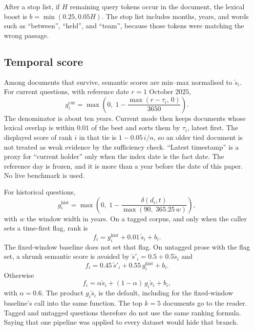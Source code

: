 \documentclass[11pt,letterpaper]{article}
\begin{document}
After a stop list, if $H$ remaining query tokens occur in the document, the lexical boost is $b=\min(0.25, 0.05H)$.
The stop list includes months, years, and words such as ``between'', ``held'', and ``team'', because those tokens were matching the wrong passage.

\subsection{Temporal score}

Among documents that survive, semantic scores are min--max normalised to $\tilde{s}_i$.
For current questions, with reference date $r=\text{1 October 2025}$,
\begin{equation}
g^{\mathrm{cur}}_i = \max\left(0,\; 1 - \frac{\max(r-\tau_i,\, 0)}{3650}\right).
\label{eq:cur}
\end{equation}
The denominator is about ten years.
Current mode then keeps documents whose lexical overlap is within $0.01$ of the best and sorts them by $\tau_i$, latest first.
The displayed score of rank $i$ in that tie is $1-0.05\,i/n$, so an older tied document is not treated as weak evidence by the sufficiency check.
``Latest timestamp'' is a proxy for ``current holder'' only when the index date is the fact date.
The reference day is frozen, and it is more than a year before the date of this paper.
No live benchmark is used.

For historical questions,
\begin{equation}
g^{\mathrm{hist}}_i
= \max\left(0,\;
1 - \frac{\delta(d_i, t)}{\max(90,\; 365.25\,w)}
\right),
\label{eq:hist}
\end{equation}
with $w$ the window width in years.
On a tagged corpus, and only when the caller sets a time-first flag, rank is
\begin{equation}
f_i = g^{\mathrm{hist}}_i + 0.01\,\tilde{s}_i + b_i .
\label{eq:timefirst}
\end{equation}
The fixed-window baseline does not set that flag.
On untagged prose with the flag set, a shrunk semantic score is avoided by $\tilde{s}'_i=0.5+0.5\tilde{s}_i$ and
\begin{equation}
f_i = 0.45\,\tilde{s}'_i + 0.55\,g^{\mathrm{hist}}_i + b_i .
\label{eq:untagged}
\end{equation}
Otherwise
\begin{equation}
f_i = \alpha \tilde{s}_i + (1-\alpha)\,g_i\tilde{s}_i + b_i ,
\label{eq:gate}
\end{equation}
with $\alpha=0.6$.
The product $g_i\tilde{s}_i$ is the default, including for the fixed-window baseline's call into the same function.
The top $k=5$ documents go to the reader.
Tagged and untagged questions therefore do not use the same ranking formula.
Saying that one pipeline was applied to every dataset would hide that branch.
\end{document}
